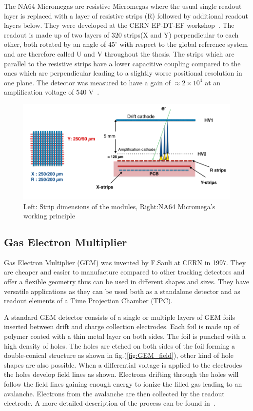 The NA64 Micromegas are resistive Micromegas where the usual single readout layer is replaced with a layer of resistive strips (R) followed by additional readout layers below. They were developed at the CERN EP-DT-EF workshop~\cite{Banerjee:2017mdu}. The readout is made up of two layers of 320 strips(X and Y) perpendicular to each other, both rotated by an angle of $45^{\circ}$ with respect to the global reference system and are therefore called U and V throughout the thesis. The strips which are parallel to the resistive strips have a lower capacitive coupling compared to the ones which are perpendicular leading to a slightly worse positional resolution in one plane. The detector was measured to have a gain of $\approx 2 \times  10^4 $ at an amplification voltage of 540 V~\cite{Banerjee:2017mdu}.

\begin{figure}[t!]
\centering
\includegraphics[width=\textwidth]{thesis_figures/NA64_MM.png}
\caption{Left: Strip dimensions of the modules, Right:NA64 Micromega's working principle~\cite{Banerjee:2017mdu}}
\label{fig:Micromegas_na64}
\end{figure}

\subsection{Gas Electron Multiplier}
\label{sec:GEM}
 Gas Electron Multiplier (GEM) was invented by F.Sauli at CERN in 1997. They are cheaper and easier to manufacture compared to other tracking detectors and offer a flexible geometry thus can be used in different shapes and sizes. They have versatile applications as they can be used both as a standalone detector and as readout elements of a Time Projection Chamber (TPC).

 A standard GEM detector consists of a single or multiple layers of  GEM foils inserted between drift and charge collection electrodes. Each foil is made up of polymer coated with a thin metal layer on both sides. The foil is punched with a high density of holes. The holes are etched on both sides of the foil forming a double-conical structure as shown in fig.(\ref{fig:GEM_field}), other kind of hole shapes are also possible. When a differential voltage is applied to the electrodes the holes develop field lines as shown. Electrons drifting through the holes will follow the field lines gaining enough energy to ionize the filled gas leading to an avalanche. Electrons from the avalanche are then collected by the readout  electrode. A more detailed description of the process can be found in~\cite{SAULI20162}.

